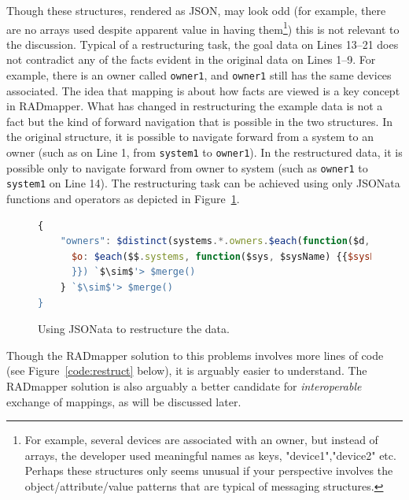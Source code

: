 \documentclass[9pt,letterpaper]{article}
\newcommand{\stt}[1]{\texttt{#1}} %
\begin{document}
Though these structures, rendered as JSON, may look odd (for example, there are no arrays used despite apparent value in having them\footnote{For example, several devices are associated with an owner, but instead of arrays, the developer used meaningful names as keys, "device1","device2" etc. Perhaps these structures only seems unusual if your perspective involves the object/attribute/value patterns that are typical of messaging structures.}) this is not relevant to the discussion.
Typical of a restructuring task, the goal data on Lines 13--21 does not contradict any of the facts evident in the original data on Lines 1--9.
For example, there is an owner called \stt{owner1}, and \stt{owner1} still has the same devices associated.
The idea that mapping is about how facts are viewed is a key concept in RADmapper.
What has changed in restructuring the example data is not a fact but the kind of forward navigation that is possible in the two structures.
In the original structure, it is possible to navigate forward from a system to an owner (such as on Line 1, from \stt{system1} to \stt{owner1}).
In the restructured data, it is possible only to navigate forward from owner to system (such as \stt{owner1} to \stt{system1} on Line 14).
The restructuring task can be achieved using only JSONata functions and operators as depicted in Figure~\ref{code:jsonata-sTPDRs}.

\begin{figure}[H]
\caption{Using JSONata to restructure the data.}
 \label{code:jsonata-sTPDRs}
\begin{lstlisting}[language=JavaScript,basicstyle=\ttfamily\scriptsize,numberstyle=\scriptsize,escapeinside=`']
{
    "owners": $distinct(systems.*.owners.$each(function($d, $ownerName) {$ownerName}))@$o.{
      $o: $each($$.systems, function($sys, $sysName) {{$sysName: $lookup($$.systems, $sysName).owners `$\sim$'> $lookup($o)
      }}) `$\sim$'> $merge()
    } `$\sim$'> $merge()
}
\end{lstlisting}
\end{figure} \vspace{-2em}

Though the RADmapper solution to this problems involves more lines of code (see Figure~\ref{code:restruct} below), it is arguably easier to understand.
The RADmapper solution is also arguably a better candidate for \textit{interoperable} exchange of mappings, as will be discussed later.
\end{document}
